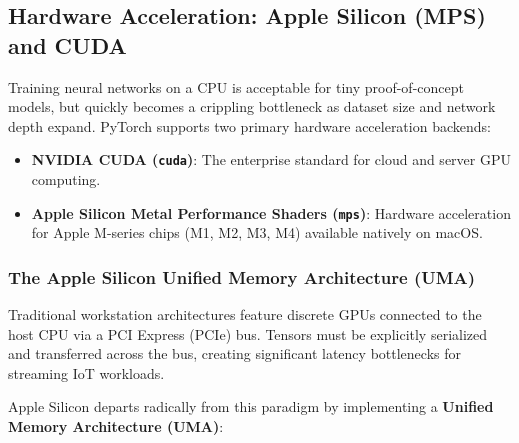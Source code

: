 \subsection{Hardware Acceleration: Apple Silicon (MPS) and CUDA}\label{subsec:hardware_acceleration}

Training neural networks on a CPU is acceptable for tiny proof-of-concept models, but quickly becomes a crippling bottleneck as dataset size and network depth expand. PyTorch supports two primary hardware acceleration backends:
\begin{itemize}
    \item \textbf{NVIDIA CUDA (\texttt{cuda})}: The enterprise standard for cloud and server GPU computing.
    \item \textbf{Apple Silicon Metal Performance Shaders (\texttt{mps})}: Hardware acceleration for Apple M-series chips (M1, M2, M3, M4) available natively on macOS.
\end{itemize}

\subsubsection{The Apple Silicon Unified Memory Architecture (UMA)}

Traditional workstation architectures feature discrete GPUs connected to the host CPU via a PCI Express (PCIe) bus. Tensors must be explicitly serialized and transferred across the bus, creating significant latency bottlenecks for streaming IoT workloads.

Apple Silicon departs radically from this paradigm by implementing a \textbf{Unified Memory Architecture (UMA)}:


